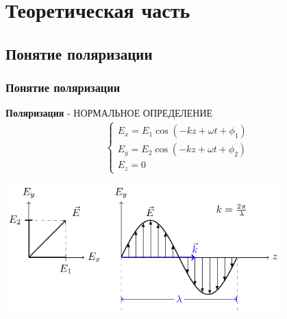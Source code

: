\documentclass[10pt,pdf,hyperref={unicode}, dvipsnames, handout]{beamer}
\begin{document}
\section{Теоретическая часть}
\begin{frame}[t]
	\subsection{Понятие поляризации}
	\frametitle{Понятие поляризации}
	\textbf{Поляризация} - НОРМАЛЬНОЕ ОПРЕДЕЛЕНИЕ	
	\begin{gather}
		\begin{cases} 
			E_x = E_1\cos\left(-kz+\omega t+ \phi_1\right) \\
			E_y = E_2\cos\left(-kz+\omega t+ \phi_2\right) \\
			E_z = 0
		\end{cases}
	\end{gather}
	\begin{center}
		\includegraphics[width=0.8\textwidth]{img/e}
	\end{center}
\end{frame}
\end{document}
